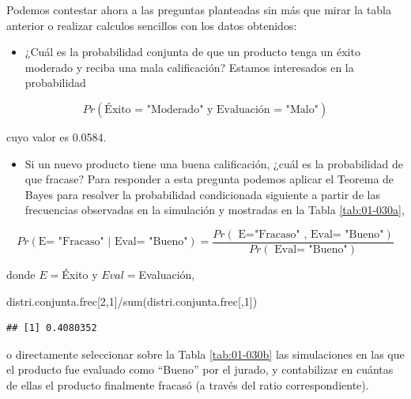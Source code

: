 \documentclass[
]{book}
\newenvironment{Shaded}{\begin{snugshade}}{\end{snugshade}}
\newcommand{\DecValTok}[1]{\textcolor[rgb]{0.00,0.00,0.81}{#1}}
\newcommand{\FunctionTok}[1]{\textcolor[rgb]{0.00,0.00,0.00}{#1}}
\newcommand{\NormalTok}[1]{#1}
\newcommand{\SpecialCharTok}[1]{\textcolor[rgb]{0.00,0.00,0.00}{#1}}
\providecommand{\tightlist}{%
  \setlength{\itemsep}{0pt}\setlength{\parskip}{0pt}}
\theoremstyle{definition}
\theoremstyle{definition}
\theoremstyle{definition}
\theoremstyle{definition}
\theoremstyle{remark}
\begin{document}
Podemos contestar ahora a las preguntas planteadas sin más que mirar la tabla anterior o realizar calculos sencillos con los datos obtenidos:

\begin{itemize}
\tightlist
\item
  ¿Cuál es la probabilidad conjunta de que un producto tenga un éxito moderado y reciba una mala calificación? Estamos interesados en la probabilidad
\end{itemize}

\[Pr(\text{Éxito = "Moderado" y Evaluación =  "Malo"})\]

cuyo valor es 0.0584.

\begin{itemize}
\tightlist
\item
  Si un nuevo producto tiene una buena calificación, ¿cuál es la probabilidad de que fracase? Para responder a esta pregunta podemos aplicar el Teorema de Bayes para resolver la probabilidad condicionada siguiente a partir de las frecuencias observadas en la simulación y mostradas en la Tabla \ref{tab:01-030a},
\end{itemize}

\[Pr(\text{E= "Fracaso" | Eval= "Bueno"}) =
\frac{Pr(\text{ E="Fracaso" , Eval= "Bueno"})}{Pr(\text{ Eval= "Bueno"})}\]

donde \(E=\)Éxito y \(Eval=\)Evaluación,

\begin{Shaded}
\begin{Highlighting}[]
\NormalTok{distri.conjunta.frec[}\DecValTok{2}\NormalTok{,}\DecValTok{1}\NormalTok{]}\SpecialCharTok{/}\FunctionTok{sum}\NormalTok{(distri.conjunta.frec[,}\DecValTok{1}\NormalTok{])}
\end{Highlighting}
\end{Shaded}

\begin{verbatim}
## [1] 0.4080352
\end{verbatim}

o directamente seleccionar sobre la Tabla \ref{tab:01-030b} las simulaciones en las que el producto fue evaluado como ``Bueno'' por el jurado, y contabilizar en cuántas de ellas el producto finalmente fracasó (a través del ratio correspondiente).
\end{document}
